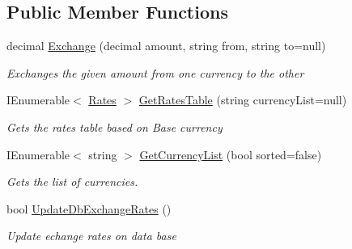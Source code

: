 \subsection*{Public Member Functions}
\begin{DoxyCompactItemize}
\item 
decimal \mbox{\hyperlink{interface_h_k_supply_1_1_helpers_1_1_currency_converter_1_1_i_currency_converter_afc064d13f2989af64d7887d3b3aa8767}{Exchange}} (decimal amount, string from, string to=null)
\begin{DoxyCompactList}\small\item\em Exchanges the given amount from one currency to the other \end{DoxyCompactList}\item 
I\+Enumerable$<$ \mbox{\hyperlink{struct_h_k_supply_1_1_helpers_1_1_currency_converter_1_1_rates}{Rates}} $>$ \mbox{\hyperlink{interface_h_k_supply_1_1_helpers_1_1_currency_converter_1_1_i_currency_converter_a3b1e96fafb375bda812c9d7a6e9fc983}{Get\+Rates\+Table}} (string currency\+List=null)
\begin{DoxyCompactList}\small\item\em Gets the rates table based on Base currency \end{DoxyCompactList}\item 
I\+Enumerable$<$ string $>$ \mbox{\hyperlink{interface_h_k_supply_1_1_helpers_1_1_currency_converter_1_1_i_currency_converter_af9f4bce7c890c7d5fb61575a641cd5ec}{Get\+Currency\+List}} (bool sorted=false)
\begin{DoxyCompactList}\small\item\em Gets the list of currencies. \end{DoxyCompactList}\item 
bool \mbox{\hyperlink{interface_h_k_supply_1_1_helpers_1_1_currency_converter_1_1_i_currency_converter_a6f4f245fc08bd5af0703c73a0c7ff001}{Update\+Db\+Exchange\+Rates}} ()
\begin{DoxyCompactList}\small\item\em Update echange rates on data base \end{DoxyCompactList}\end{DoxyCompactItemize}
